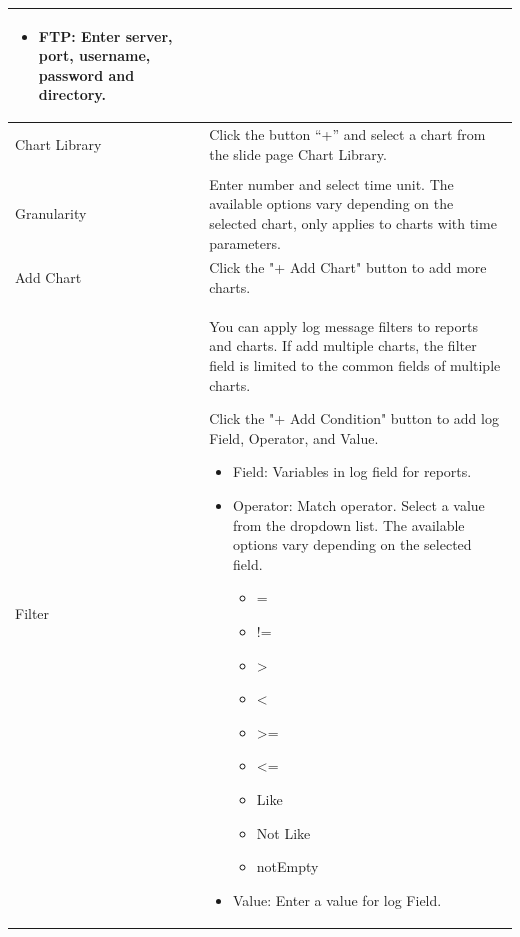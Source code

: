 \begin{description}
\begin{longtable}{p{}|p{}}
\begin{itemize}
                            \item FTP: Enter server, port, username, password and directory.
                        \end{itemize} \\\hline 
        Chart Library & Click the button “+” and select a chart from the slide page Chart Library. \\\hline 
        \tabincell{l}{Time\\ Granularity} & Enter number and select time unit. The available options vary depending on the selected chart, only applies to charts with time parameters.\\\hline 
        Add Chart & Click the "+ Add Chart" button to add more charts.\\\hline 
        Filter & You can apply log message filters to reports and charts. If add multiple charts, the filter field is limited to the common fields of multiple charts.
                
        
                Click the "+ Add Condition" button to add log Field, Operator, and Value.
                \begin{itemize}
                    \item Field: Variables in log field for reports. 
                    \item Operator: Match operator. Select a value from the dropdown list. The available options vary depending on the selected field.  
                    \begin{itemize}  
                        \item =    \item !=    \item >    \item <     \item >=    \item <=   \item Like   \item Not Like    \item notEmpty 
                    \end{itemize}
                    \item Value: Enter a value for log Field. 
                \end{itemize} \\\hline
    \end{longtable}    
\end{description}

